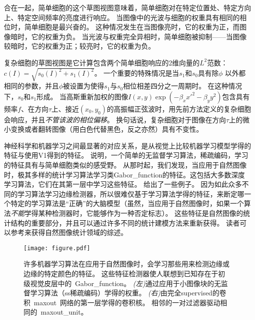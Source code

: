 合在一起，简单细胞的这个草图视图意味着，简单细胞对在特定位置处、特定方向上、特定空间频率的亮度进行响应。
当图像中的光波与细胞的权重具有相同的相位时，简单细胞是最兴奋的。
这种情况发生在当图像亮时，它的权重为正，而图像暗时，它的权重为负。
当光波与权重完全异相时，简单细胞被抑制——当图像较暗时，它的权重为正；较亮时，它的权重为负。
 
 
复杂细胞的草图视图是它计算包含两个简单细胞响应的2维向量的$L^2$范数：$c(I)=\sqrt{s_0(I)^2 + s_1(I)^2}$。
一个重要的特殊情况是当$s_1$和$s_0$具有除$\phi$ 以外都相同的参数，并且$\phi$被设置为使得$s_1$与$s_0$相位相差四分之一周期时。
在这种情况下，$s_0$和$s_1$形成。
当高斯重新加权的图像$I(x,y)\exp(-\beta_x x'^2 -\beta_y y^2)$包含具有频率$f$、在方向$\tau$上、接近$(x_0, y_0)$的高振幅正弦波时，用先前方法定义的复杂细胞会响应，并且\emph{不管该波的相位偏移}。
换句话说，复杂细胞对于图像在方向$\tau$上的微小变换或者翻转图像（用白色代替黑色，反之亦然）具有不变性。

神经科学和机器学习之间最显著的对应关系，是从视觉上比较机器学习模型学得的特征与使用V1得到的特征。
\cite{Olshausen+Field-1996}说明，一个简单的无监督学习算法，稀疏编码，学习的特征具有与简单细胞类似的感受野。
从那时起，我们发现，当应用于自然图像时，极其多样的统计学习算法学习类\gls{Gabor_function}的特征。这包括大多数深度学习算法，它们在其第一层中学习这些特征。
给出了一些例子。
因为如此众多不同的学习算法学习边缘检测器，所以很难仅基于学习算法学得的特征，来断定哪一个特定的学习算法是``正确''的大脑模型（虽然，当应用于自然图像时，如果一个算法\emph{不能}学得某种检测器时，它能够作为一种否定标志）。
这些特征是自然图像的统计结构的重要部分，并且可以通过许多不同的统计建模方法来重新获得。
读者可以参考\citep{hyvarinen-book2009}来获得自然图像统计领域的综述。
\begin{figure}
\ifOpenSource
\centerline{\texttt{[image: figure.pdf]}}
\else
\centering    
{}    
\fi
\caption{许多机器学习算法在应用于自然图像时，会学习那些用来检测边缘或边缘的特定颜色的特征。 
这些特征检测器使人联想到已知存在于初级视觉皮层中的~\gls{Gabor_function}。   
\emph{(左)}通过应用于小图像块的无监督学习算法（\gls{ss}稀疏编码）学得的权重。%
\emph{(右)}由完全\gls{supervised}的卷积~\gls{maxout}~网络的第一层学得的卷积核。 相邻的一对过滤器驱动相同的~\gls{maxout_unit}。}     
\label{fig:chap9_feature_detectors}     
\end{figure}

